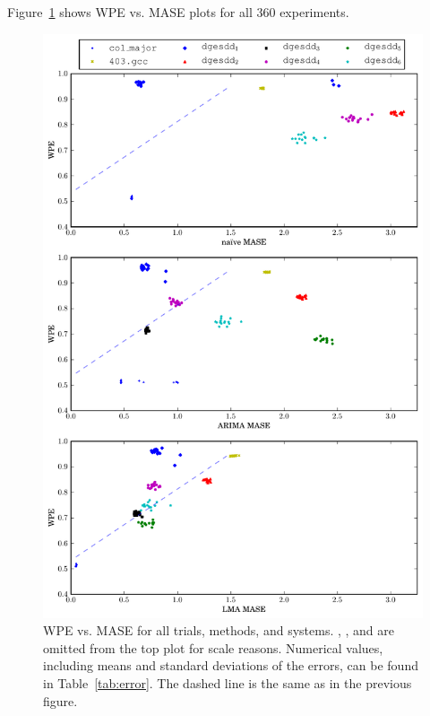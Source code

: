Figure~\ref{fig:wpe_vs_mase_all} shows WPE vs. MASE plots for all 360
experiments.
\begin{figure}
  \centering
  \includegraphics[width=\columnwidth]{figs/predictions_vs_entropy3}
\caption{WPE vs. MASE for all trials, methods, and systems. \svdone,
  \svdthree, and \svdfive are omitted from the top plot for scale
  reasons.
% 
% 
Numerical values, including means and standard deviations of the
errors, can be found in Table~\ref{tab:error}.  The dashed line is the
same as in the previous figure.
}
    \label{fig:wpe_vs_mase_all}
\end{figure} 
